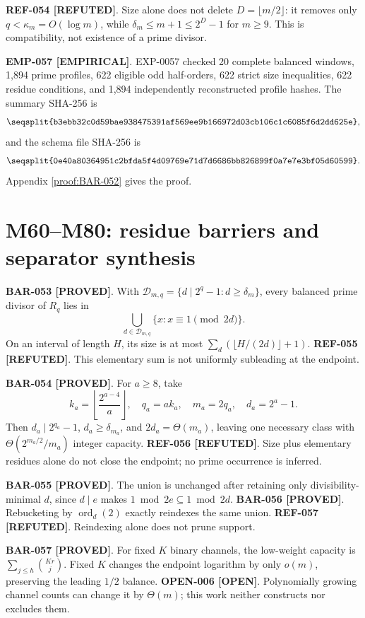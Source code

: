 \documentclass[11pt]{article}
\newcommand{\claimstatus}[2]{\textbf{#1 [#2]}}
\begin{document}
\claimstatus{REF-054}{REFUTED}. Size alone does not delete
\(D=\lfloor m/2\rfloor\): it removes only \(q<\kappa_m=O(\log m)\),
while \(\delta_m\le m+1\le2^D-1\) for \(m\ge9\). This is compatibility,
not existence of a prime divisor.

\claimstatus{EMP-057}{EMPIRICAL}. EXP-0057 checked 20 complete balanced
windows, 1,894 prime profiles, 622 eligible odd half-orders, 622 strict
size inequalities, 622 residue conditions, and 1,894 independently
reconstructed profile hashes. The summary SHA-256 is
\[
\texttt{\seqsplit{b3ebb32c0d59bae938475391af569ee9b166972d03cb106c1c6085f6d2dd625e}},
\]
and the schema file SHA-256 is
\[
\texttt{\seqsplit{0e40a80364951c2bfda5f4d09769e71d7d6686bb826899f0a7e7e3bf05d60599}}.
\]
Appendix \ref{proof:BAR-052} gives the proof.

\section{M60--M80: residue barriers and separator synthesis}

\claimstatus{BAR-053}{PROVED}. With
\(\mathcal D_{m,q}=\{d\mid2^q-1:d\ge\delta_m\}\), every balanced prime
divisor of \(R_q\) lies in
\[
\bigcup_{d\in\mathcal D_{m,q}}\{x:x\equiv1\pmod{2d}\}.
\tag{M60.1}
\]
On an interval of length \(H\), its size is at most
\(\sum_d(\lfloor H/(2d)\rfloor+1)\).
\claimstatus{REF-055}{REFUTED}. This elementary sum is not uniformly
subleading at the endpoint.

\claimstatus{BAR-054}{PROVED}. For \(a\ge8\), take
\[
k_a=\left\lfloor\frac{2^{a-4}}a\right\rfloor,\quad
q_a=ak_a,\quad m_a=2q_a,\quad d_a=2^a-1.
\tag{M61.1}
\]
Then \(d_a\mid2^{q_a}-1\), \(d_a\ge\delta_{m_a}\), and
\(2d_a=\Theta(m_a)\), leaving one necessary class with
\(\Theta(2^{m_a/2}/m_a)\) integer capacity.
\claimstatus{REF-056}{REFUTED}. Size plus elementary residues alone do not
close the endpoint; no prime occurrence is inferred.

\claimstatus{BAR-055}{PROVED}. The union is unchanged after retaining only
divisibility-minimal \(d\), since \(d\mid e\) makes
\(1\bmod2e\subseteq1\bmod2d\).
\claimstatus{BAR-056}{PROVED}. Rebucketing by
\(\operatorname{ord}_d(2)\) exactly reindexes the same union.
\claimstatus{REF-057}{REFUTED}. Reindexing alone does not prune support.

\claimstatus{BAR-057}{PROVED}. For fixed \(K\) binary channels, the
low-weight capacity is \(\sum_{j\le h}\binom{Kr}{j}\). Fixed \(K\) changes
the endpoint logarithm by only \(o(m)\), preserving the leading \(1/2\)
balance.
\claimstatus{OPEN-006}{OPEN}. Polynomially growing channel counts can
change it by \(\Theta(m)\); this work neither constructs nor excludes them.
\end{document}
